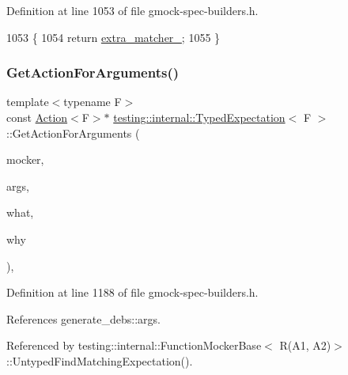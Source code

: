 Definition at line 1053 of file gmock-\/spec-\/builders.\+h.


\begin{DoxyCode}
1053                                                              \{
1054     \textcolor{keywordflow}{return} \hyperlink{classtesting_1_1internal_1_1TypedExpectation_a7d2fef3d4429a3a350282e6030a45ba4}{extra\_matcher\_};
1055   \}
\end{DoxyCode}
\mbox{\label{classtesting_1_1internal_1_1TypedExpectation_a2e6b527b4de669f66af63be395f0985d}} 
\subsubsection{\texorpdfstring{Get\+Action\+For\+Arguments()}{GetActionForArguments()}}
{\footnotesize\ttfamily template$<$typename F$>$ \\
const \hyperlink{classtesting_1_1Action}{Action}$<$F$>$$\ast$ \hyperlink{classtesting_1_1internal_1_1TypedExpectation}{testing\+::internal\+::\+Typed\+Expectation}$<$ F $>$\+::Get\+Action\+For\+Arguments (\begin{DoxyParamCaption}\item[{const \hyperlink{classtesting_1_1internal_1_1FunctionMockerBase}{Function\+Mocker\+Base}$<$ F $>$ $\ast$}]{mocker,  }\item[{const \hyperlink{classtesting_1_1internal_1_1TypedExpectation_a9a91379262d101f435809ba4556d14fa}{Argument\+Tuple} \&}]{args,  }\item[{\+::std\+::ostream $\ast$}]{what,  }\item[{\+::std\+::ostream $\ast$}]{why }\end{DoxyParamCaption})\hspace{0.3cm}{\ttfamily [inline]}, {\ttfamily [private]}}



Definition at line 1188 of file gmock-\/spec-\/builders.\+h.



References generate\+\_\+debs\+::args.



Referenced by testing\+::internal\+::\+Function\+Mocker\+Base$<$ R(\+A1, A2)$>$\+::\+Untyped\+Find\+Matching\+Expectation().



